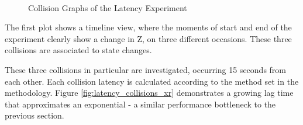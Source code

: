 \begin{figure}[!h]
    \raggedright
    \hspace{2cm}\\
    \hspace{2cm}
    \caption{Collision Graphs of the Latency Experiment}
\end{figure}

The first plot shows a timeline view, where the moments of start and end of the experiment clearly show a change in Z, on three different occasions. These three collisions are associated to state changes. 

These three collisions in particular are investigated, occurring 15 seconds from each other. Each collision latency is calculated according to the method set in the methodology. Figure \ref{fig:latency_collisions_xr} demonstrates a growing lag time that approximates an exponential  - a similar performance bottleneck to the previous section.

